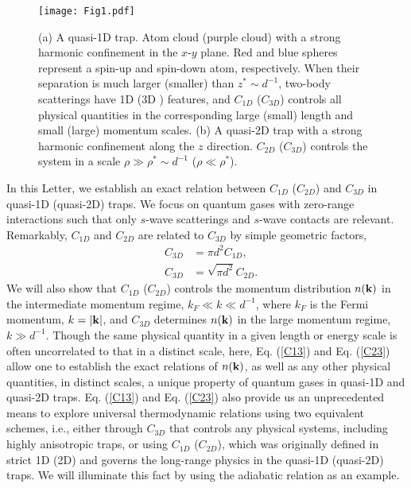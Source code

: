 \documentclass[twocolumn, prl]{revtex4}
\begin{document}
\begin{figure}
	\centering
	{\texttt{[image: Fig1.pdf]}}
	\caption{(a) A quasi-1D trap. Atom cloud (purple cloud) with a strong harmonic confinement in the $x$-$y$ plane. Red and blue spheres represent a spin-up and spin-down atom, respectively. When their separation is much larger (smaller) than $z^{*}\sim d^{-1}$, two-body scatterings have 1D (3D ) features, and $C_{1D}$ ($C_{3D}$) controls all physical quantities in the corresponding large (small) length and small (large) momentum scales.  (b) A quasi-2D trap with a strong harmonic confinement along the $z$ direction. $C_{2D}$ ($C_{3D}$) controls the system in a scale $\rho\gg \rho^{*}\sim d^{-1}$ ($\rho\ll \rho^{*}$). }\label{Fig1}
\end{figure}

In this Letter, we establish an exact relation between $C_{1D}$ ($C_{2D}$) and $C_{3D}$ in quasi-1D (quasi-2D) traps. We focus on quantum gases with zero-range interactions such that only $s$-wave scatterings and $s$-wave contacts are relevant. Remarkably, $C_{1D}$ and $C_{2D}$ are related to $C_{3D}$ by simple geometric factors,
\begin{eqnarray}
&C_{3D}&=\pi d^2  C_{1D}, \label{C13}\\
&C_{3D}&=\sqrt{\pi d^2}  C_{2D}. \label{C23}
\end{eqnarray}
We will also show that $C_{1D}$ ($C_{2D}$) controls the momentum distribution $n({\bf k})$ in the intermediate momentum regime, $k_F\ll k\ll d^{-1}$, where $k_F$ is the Fermi momentum, $k=|{\bf k}|$, and $C_{3D}$ determines $n({\bf k})$ in the large momentum regime, $k\gg d^{-1}$. Though the same physical quantity in a given length or energy scale is often uncorrelated to that in a distinct scale, here, Eq. (\ref{C13}) and Eq. (\ref{C23}) allow one to establish the exact relations of $n({\bf k})$, as well as any other physical quantities, in distinct scales, a unique property of quantum gases in quasi-1D and quasi-2D traps. Eq. (\ref{C13}) and Eq. (\ref{C23}) also provide us an unprecedented means to explore universal thermodynamic relations using two equivalent schemes, i.e., either through  $C_{3D}$ that controls any physical systems, including highly anisotropic traps, or using $C_{1D}$ ($C_{2D}$), which was originally defined in strict 1D (2D) and governs the long-range physics in the quasi-1D (quasi-2D) traps.  We will illuminate this fact by using the adiabatic relation as an example. 
\end{document}
